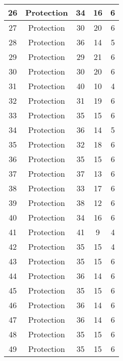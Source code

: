 \documentclass[results.tex]{subfiles}
\begin{document}
\begin{center}
\begin{tabular}{| c || c | c | c | c |}
    \hline
    26 & Protection & 34 & 16 & 6 \\ 
    \hline
    27 & Protection & 30 & 20 & 6 \\ 
    \hline
    28 & Protection & 36 & 14 & 5 \\ 
    \hline
    29 & Protection & 29 & 21 & 6 \\ 
    \hline
    30 & Protection & 30 & 20 & 6 \\ 
    \hline
    31 & Protection & 40 & 10 & 4 \\ 
    \hline
    32 & Protection & 31 & 19 & 6 \\ 
    \hline
    33 & Protection & 35 & 15 & 6 \\ 
    \hline
    34 & Protection & 36 & 14 & 5 \\ 
    \hline
    35 & Protection & 32 & 18 & 6 \\ 
    \hline
    36 & Protection & 35 & 15 & 6 \\ 
    \hline
    37 & Protection & 37 & 13 & 6 \\ 
    \hline
    38 & Protection & 33 & 17 & 6 \\ 
    \hline
    39 & Protection & 38 & 12 & 6 \\ 
    \hline
    40 & Protection & 34 & 16 & 6 \\ 
    \hline
    41 & Protection & 41 & 9 & 4 \\ 
    \hline
    42 & Protection & 35 & 15 & 4 \\ 
    \hline
    43 & Protection & 35 & 15 & 6 \\ 
    \hline
    44 & Protection & 36 & 14 & 6 \\ 
    \hline
    45 & Protection & 35 & 15 & 6 \\ 
    \hline
    46 & Protection & 36 & 14 & 6 \\ 
    \hline
    47 & Protection & 36 & 14 & 6 \\ 
    \hline
    48 & Protection & 35 & 15 & 6 \\ 
    \hline
    49 & Protection & 35 & 15 & 6 \\ 
    \hline   \end{tabular}
\end{center}
\end{document}
